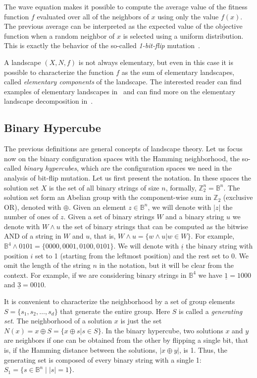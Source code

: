 \documentclass{article}
\newcommand{\Bo}[0]{\mathbb{B}}
\newcommand{\Za}[0]{\mathbb{Z}}
\begin{document}
The wave equation makes it possible to compute the average value of the fitness function $f$ evaluated over all of the neighbors of $x$ using only the value $f(x)$.
The previous average can be interpreted as the expected value of the objective function when a random neighbor of $x$ is selected using a uniform distribution. This is exactly the behavior of the so-called \emph{1-bit-flip} mutation~\citep{Garnier1999}.


A landscape $(X,N,f)$ is not always elementary, but even in this case it is possible to characterize the function $f$ as the sum of elementary landscapes, called \emph{elementary components} of the landscape. The interested reader can find examples of elementary landscapes in~\cite{Whitley2008,WhitleySutton2009} and can find more on the elementary landscape decomposition in~\cite{Chicano2011ecj}.

\subsection{Binary Hypercube}
\label{subsec:binary}

The previous definitions are general concepts of landscape theory. Let us focus now on the binary configuration spaces with the Hamming neighborhood, the so-called \emph{binary hypercubes}, which are the configuration spaces we need in the analysis of bit-flip mutation. Let us first present the notation. In these spaces the solution set $X$ is the set of all binary strings of size $n$, formally, $\Za_2^n=\Bo^n$. The solution set form an Abelian group with the component-wise sum in $\Za_2$ (exclusive OR), denoted with $\oplus$. Given an element $z \in \Bo^n$, we will denote with $|z|$ the number of ones of $z$. Given a set of binary strings $W$ and a binary string $u$ we denote with $W \wedge u$ the set of binary strings that can be computed as the bitwise AND of a string in $W$ and $u$, that is, $W \wedge u = \{w \wedge u | w \in W\}$. For example, $\Bo^4 \wedge 0101 = \{0000, 0001, 0100, 0101\}$. We will denote with $\underline{i}$ the binary string with position $i$ set to 1 (starting from the leftmost position) and the rest set to 0. We omit the length of the string $n$ in the notation, but it will be clear from the context. For example, if we are considering binary strings in $\Bo^4$ we have $\underline{1}=1000$ and $\underline{3}=0010$.

It is convenient to characterize the neighborhood by a set of group elements $S=\{s_1,s_2,\ldots,s_d\}$ that generate the entire group. Here $S$ is called a \emph{generating set}. The neighborhood of a solution $x$ is just the set $N(x) = x \oplus S = \{x \oplus s | s \in S\}$. In the binary hypercube, two solutions $x$ and $y$ are neighbors if one can be obtained from the other by flipping a single bit, that is, if the Hamming distance between the solutions, $|x\oplus y|$, is 1. Thus, the generating set is composed of every binary string with a single 1: $S_1=\{s \in \Bo^n \mid |s|=1\}$.
\end{document}
